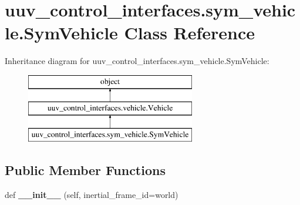 \hypertarget{classuuv__control__interfaces_1_1sym__vehicle_1_1SymVehicle}{}\section{uuv\+\_\+control\+\_\+interfaces.\+sym\+\_\+vehicle.\+Sym\+Vehicle Class Reference}
\label{classuuv__control__interfaces_1_1sym__vehicle_1_1SymVehicle}
Inheritance diagram for uuv\+\_\+control\+\_\+interfaces.\+sym\+\_\+vehicle.\+Sym\+Vehicle\+:\begin{figure}[H]
\begin{center}
\leavevmode
\includegraphics[height=3.000000cm]{classuuv__control__interfaces_1_1sym__vehicle_1_1SymVehicle}
\end{center}
\end{figure}
\subsection*{Public Member Functions}
\begin{DoxyCompactItemize}
\item 
\mbox{\label{classuuv__control__interfaces_1_1sym__vehicle_1_1SymVehicle_a051443f66e198b47b0c601e889f08ac1}} 
def {\bfseries \+\_\+\+\_\+init\+\_\+\+\_\+} (self, inertial\+\_\+frame\+\_\+id=\textquotesingle{}world\textquotesingle{})
\end{DoxyCompactItemize}
